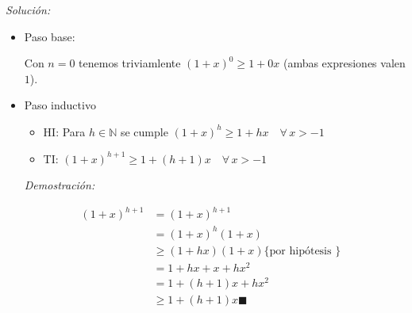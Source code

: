 \documentclass[10pt,a4paper]{article}
\newcommand{\qed}{\blacksquare}
\begin{document}
\noindent
\emph{Solución:}

\begin{itemize}
\item Paso base:
  
  Con $n=0$ tenemos triviamlente $(1+x)^0 \geq 1+0x$
  (ambas expresiones valen $1$).
  
\item Paso inductivo

  \begin{itemize}
  \item HI: Para $h \in \mathbb{N}$ se cumple
    $(1+x)^h \geq 1+hx \quad \forall \, x>-1$
  \item TI: $(1+x)^{h+1} \geq 1+(h+1)x \quad \forall \, x>-1$
  \end{itemize}
\emph{Demostración:}

\begin{align*}
  (1+x)^{h+1} &= (1+x)^{h+1} &\\
  &=    (1+x)^{h}(1+x) &\\
  &\geq (1+hx)(1+x) \text{\{ por hipótesis \}}&\\
  &=    1+hx+x+hx^2 &\\
  &=    1+(h+1)x+hx^2 &\\
  &\geq 1+(h+1)x \qed &\\
\end{align*}
  
\end{itemize}
\end{document}
